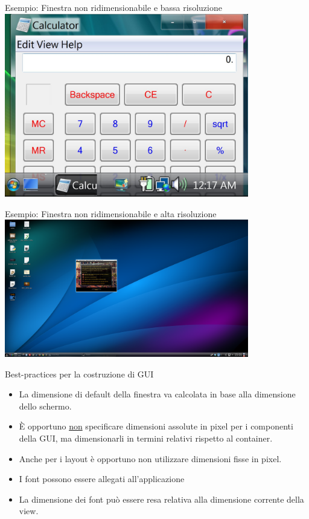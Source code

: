 \documentclass[presentation]{beamer}
\begin{document}
\begin{frame}{Esempio: Finestra non ridimensionabile e bassa risoluzione}
\centering
\includegraphics[width=0.8\textwidth]{img/lowres}
\end{frame}

\begin{frame}{Esempio: Finestra non ridimensionabile e alta risoluzione}
\centering
\includegraphics[width=0.8\textwidth]{img/brokensword}
\end{frame}

\begin{frame}{Best-practices per la costruzione di GUI}
\begin{itemize}\itemsep10pt
\item La dimensione di default della finestra va calcolata in base alla dimensione dello schermo.
\item \`{E} opportuno \underline{non} specificare dimensioni assolute in pixel per i componenti della GUI, ma dimensionarli in termini relativi rispetto al container.
\item Anche per i layout è opportuno non utilizzare dimensioni fisse in pixel.
\item I font possono essere allegati all'applicazione
\item La dimensione dei font può essere resa relativa alla dimensione corrente della view.
\end{itemize}
\end{frame}
\end{document}
